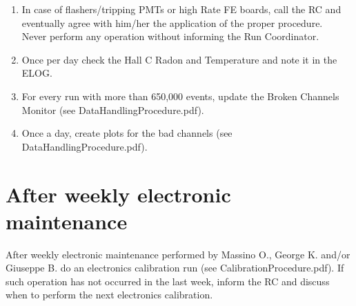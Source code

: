 \documentclass[a4paper,11pt]{article}
\begin{document}
\begin{enumerate}
\item In case of flashers/tripping PMTs or high Rate FE boards, call the RC and eventually agree with him/her the application 
of the proper procedure. \\
Never perform any operation without informing the Run Coordinator.

\item Once per day check the Hall C Radon and Temperature and note it in the ELOG.

\item For every run with more than 650,000 events, update the Broken Channels Monitor (see DataHandlingProcedure.pdf).

\item Once a day, create plots for the bad channels (see DataHandlingProcedure.pdf).
\end{enumerate}

\section*{After weekly electronic maintenance}
After weekly electronic maintenance performed by Massino O., George K. and/or Giuseppe B. do an electronics calibration run (see CalibrationProcedure.pdf).
If such operation has not occurred in the last week, inform the RC and discuss when to perform the next electronics calibration.
\end{document}
